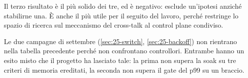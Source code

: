 Il terzo risultato \`e il pi\`u solido dei tre, ed \`e negativo: esclude
un'ipotesi anzich\'e stabilirne una. \`E anche il pi\`u utile per il seguito del
lavoro, perch\'e restringe lo spazio di ricerca sul meccanismo del cross-talk al
control plane condiviso.

Le due campagne di settembre (\cref{sec:25-switch}, \cref{sec:25-backoff}) non
rientrano nella tabella precedente perch\'e non confrontano controllori. Entrambe
hanno un esito misto che il progetto ha lasciato tale: la prima non supera la soak
su tre criteri di memoria ereditati, la seconda non supera il gate del p99 su un
braccio.
